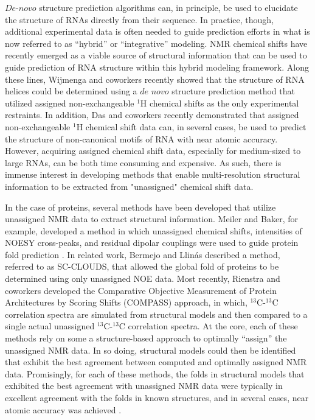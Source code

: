 \documentclass[journal=jcisd8,manuscript=article,layout=onecolumn]{achemso}
\begin{document}
$\textit{De-novo}$ structure prediction algorithms can, in principle, be used to elucidate the structure of RNAs directly from their sequence. In practice, though, additional experimental data is often needed to guide prediction efforts in what is now referred to as ``hybrid'' or ``integrative'' modeling\cite{burke2012structure, lee2016integrative}. NMR chemical shifts have recently emerged as a viable source of structural information that can be used to guide prediction of RNA structure within this hybrid modeling framework. Along these lines, Wijmenga and coworkers recently showed that the structure of RNA helices could be determined using a $\textit{de novo}$ structure prediction method that utilized assigned non-exchangeable $^{1}$H chemical shifts  as the only experimental restraints\cite{van2013nucleic}.  In addition, Das and coworkers recently demonstrated that assigned non-exchangeable $^{1}$H chemical shift  data can, in several cases, be used to predict the structure of non-canonical motifs of RNA with near atomic accuracy\cite{sripakdeevong2014structure}. However, acquiring assigned chemical shift data, especially for medium-sized to large RNAs, can be both time consuming and expensive. As such, there is immense interest in developing methods that enable multi-resolution structural information to be extracted from "unassigned" chemical shift data.

In the case of proteins, several methods have been developed that utilize unassigned NMR data to extract structural information. Meiler and Baker, for example, developed a method in which unassigned chemical shifts, intensities of NOESY cross-peaks, and residual dipolar couplings were used to guide protein fold prediction \cite{meiler2003rapid}. In related work, Bermejo and Llin{\'a}s described a method, referred to as SC-CLOUDS, that allowed the global fold of proteins to be determined using only unassigned NOE data\cite{bermejo2008deuterated}. Most recently, Rienstra and coworkers developed the Comparative Objective Measurement of Protein Architectures by Scoring Shifts (COMPASS) approach, in which, $^{13}$C-$^{13}$C correlation spectra are simulated from structural models and then compared to a single actual unassigned  $^{13}$C-$^{13}$C correlation spectra\cite{courtney2015experimental}. At the core, each of these methods rely on some a structure-based approach to optimally ``assign'' the unassigned NMR data. In so doing, structural models could then be identified that exhibit the best agreement between computed and optimally assigned NMR data. Promisingly, for each of these methods, the folds in structural models that exhibited the best agreement with unassigned NMR data were typically in excellent agreement with the folds in known structures, and in several cases, near atomic accuracy was achieved \cite{meiler2003rapid, courtney2015experimental}. 
\end{document}
